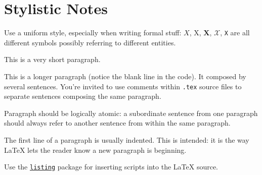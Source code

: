 \documentclass{scrartcl}
\begin{document}

















\section*{Stylistic Notes}

Use a uniform style, especially when writing formal stuff: $X$, X, $\mathbf{X}$, $\mathcal{X}$, \texttt{X} are all different symbols possibly referring to different entities. 

This is a very short paragraph.

This is a longer paragraph (notice the blank line in the code).
It composed by several sentences.
%
You're invited to use comments within \texttt{.tex} source files to separate sentences composing the same paragraph.

Paragraph should be logically atomic: a subordinate sentence from one paragraph should always refer to another sentence from within the same paragraph.

The first line of a paragraph is usually indented.
%
This is intended: it is the way \LaTeX{} lets the reader know a new paragraph is beginning.

Use the \href{https://en.wikibooks.org/wiki/LaTeX/Source_Code_Listings}{\texttt{listing}} package for inserting scripts into the \LaTeX{} source.

\nocite{*} %


\end{document}

